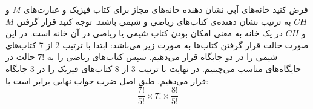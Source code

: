 \p
 فرض کنید خانه‌های آبی نشان دهنده خانه‌های مجاز برای کتاب فیزیک و عبارت‌های 
 $M$ و $CH$
 به ترتیب نشان دهنده‌ی کتاب‌های ریاضی و شیمی باشند.
  توجه کنید قرار گرفتن 
 $M$ و $CH$
در یک خانه به معنی امکان بودن کتاب شیمی یا ریاضی در آن خانه است. 
 در این صورت حالت قرار گرفتن کتاب‌ها به صورت زیر می‌باشد:
ابتدا با ترتیب 2 از 7 کتاب‌های شیمی را در دو جایگاه
  قرار می‌دهیم.
 سپس کتاب‌‌های ریاضی را به
 \underline{$7!$ حالت}
 در جایگاه‌های مناسب
 می‌چینیم.
 در نهایت با ترتیب 3 از 8
  کتاب‌های فیزیک را
در 3 جایگاه قرار می‌دهیم.
  طبق اصل ضرب جواب نهایی برابر است با:
$$\frac{7!}{5!}\times7! \times \frac{8!}{5!}$$